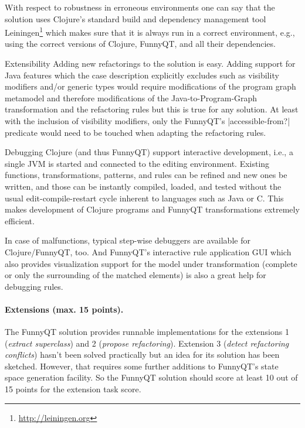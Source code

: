 \documentclass[submission]{eptcs}
\newcommand{\code}{\clojureinline}
\begin{document}
\begin{compactdesc}
  With respect to robustness in erroneous environments one can say that the
  solution uses Clojure's standard build and dependency management tool
  Leiningen\footnote{\url{http://leiningen.org}} which makes sure that it is
  always run in a correct environment, e.g., using the correct versions of
  Clojure, FunnyQT, and all their dependencies.
\item[Extensibility] Adding new refactorings to the solution is easy.  Adding
  support for Java features which the case description explicitly excludes such
  as visibility modifiers and/or generic types would require modifications of
  the program graph metamodel and therefore modifications of the
  Java-to-Program-Graph transformation and the refactoring rules but this is
  true for any solution.  At least with the inclusion of visibility modifiers,
  only the FunnyQT's \code|accessible-from?| predicate would need to be touched
  when adapting the refactoring rules.
\item[Debugging] Clojure (and thus FunnyQT) support interactive development,
  i.e., a single JVM is started and connected to the editing environment.
  Existing functions, transformations, patterns, and rules can be refined and
  new ones be written, and those can be instantly compiled, loaded, and tested
  without the usual edit-compile-restart cycle inherent to languages such as
  Java or C.  This makes development of Clojure programs and FunnyQT
  transformations extremely efficient.

  In case of malfunctions, typical step-wise debuggers are available for
  Clojure/FunnyQT, too.  And FunnyQT's interactive rule application GUI which
  also provides visualization support for the model under transformation
  (complete or only the surrounding of the matched elements) is also a great
  help for debugging rules.
\end{compactdesc}


\paragraph{Extensions (max. 15 points).}

The FunnyQT solution provides runnable implementations for the extensions 1
(\emph{extract superclass}) and 2 (\emph{propose refactoring}).  Extension 3
(\emph{detect refactoring conflicts}) hasn't been solved practically but an
idea for its solution has been sketched.  However, that requires some further
additions to FunnyQT's state space generation facility.  So the FunnyQT
solution should score at least 10 out of 15 points for the extension task
score.
\end{document}
